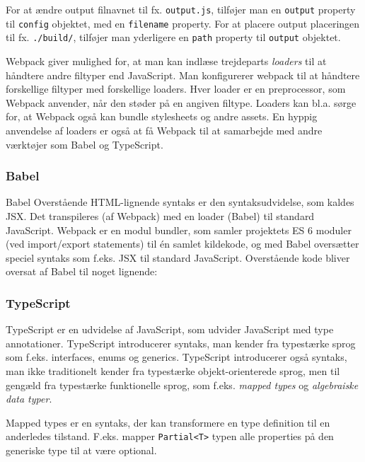 \documentclass[]{article}
\begin{document}
For at ændre output filnavnet til fx. \texttt{output.js}, tilføjer man
en \texttt{output} property til \texttt{config} objektet, med en
\texttt{filename} property. For at placere output placeringen til fx.
\texttt{./build/}, tilføjer man yderligere en \texttt{path} property til
\texttt{output} objektet.

Webpack giver mulighed for, at man kan indlæse trejdeparts
\emph{loaders} til at håndtere andre filtyper end JavaScript. Man
konfigurerer webpack til at håndtere forskellige filtyper med
forskellige loaders. Hver loader er en preprocessor, som Webpack
anvender, når den støder på en angiven filtype. Loaders kan bl.a. sørge
for, at Webpack også kan bundle stylesheets og andre assets. En hyppig
anvendelse af loaders er også at få Webpack til at samarbejde med andre
værktøjer som Babel og TypeScript.

\hypertarget{babel}{%
\subsubsection{Babel}\label{babel}}

Babel Overstående HTML-lignende syntaks er den syntaksudvidelse, som
kaldes JSX. Det transpileres (af Webpack) med en loader (Babel) til
standard JavaScript. Webpack er en modul bundler, som samler projektets
ES 6 moduler (ved import/export statements) til én samlet kildekode, og
med Babel oversætter speciel syntaks som f.eks. JSX til standard
JavaScript. Overstående kode bliver oversat af Babel til noget lignende:

\hypertarget{typescript}{%
\subsubsection{TypeScript}\label{typescript}}

TypeScript er en udvidelse af JavaScript, som udvider JavaScript med
type annotationer. TypeScript introducerer syntaks, man kender fra
typestærke sprog som f.eks. interfaces, enums og generics. TypeScript
introducerer også syntaks, man ikke traditionelt kender fra typestærke
objekt-orienterede sprog, men til gengæld fra typestærke funktionelle
sprog, som f.eks. \emph{mapped types} og \emph{algebraiske data typer}.

Mapped types er en syntaks, der kan transformere en type definition til
en anderledes tilstand. F.eks. mapper
\texttt{Partial\textless{}T\textgreater{}} typen alle properties på den
generiske type til at være optional.
\end{document}
